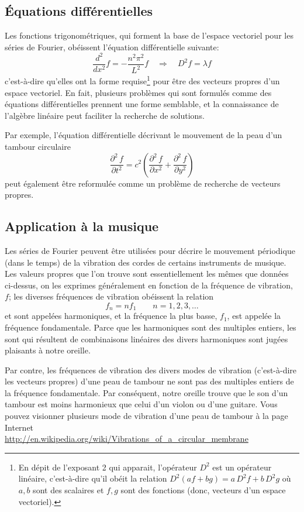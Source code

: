 \subsection{Équations différentielles}

Les fonctions trigonométriques, qui forment la base de l'espace vectoriel pour les séries de Fourier,
obéissent l'équation différentielle suivante:
\[
\frac{d^2}{dx^2} f = -\frac{n^2\pi^2}{L^2} f \quad \Rightarrow \quad D^2 f = \lambda f
\]
c'est-à-dire qu'elles ont la forme requise\footnote{En dépit de l'exposant 2 qui apparait,
l'opérateur $D^2$ est un opérateur linéaire, c'est-à-dire qu'il obéit la relation
$D^2(af+bg) = a\,D^2f + b\,D^2g$ où $a,b$ sont des scalaires et $f,g$ sont des fonctions (donc, vecteurs
d'un espace vectoriel).} pour être des vecteurs propres d'un espace vectoriel.
En fait, plusieurs problèmes qui sont formulés comme des équations différentielles prennent une forme
semblable, et la connaissance de l'algèbre linéaire peut faciliter la recherche de solutions.

Par exemple, l'équation différentielle décrivant le mouvement de la peau d'un tambour circulaire
\[
\frac{\partial^2 \, f}{\partial t^2} = c^2 \left(\frac{\partial^2 \, f}{\partial x^2} + \frac{\partial^2 \, f}{\partial y^2}\right)
\]
peut également être reformulée comme un problème de recherche de vecteurs propres.

\subsection{Application à la musique}

Les séries de Fourier peuvent être utilisées pour décrire le mouvement périodique (dans le temps) de
la vibration des cordes de certains instruments de musique.  Les valeurs propres que l'on trouve sont
essentiellement les mêmes que données ci-dessus, on les exprimes généralement en fonction de la fréquence
de vibration, $f$; les diverses fréquences de  vibration obéissent la relation
\[
f_n = n f_1 \qquad n = 1, 2, 3, \ldots
\]
et sont appelées harmoniques, et la fréquence la plus basse, $f_1$, est appelée la fréquence fondamentale.
Parce que les harmoniques sont des multiples entiers, les sont qui résultent de combinaisons linéaires
des divers harmoniques sont jugées plaisants à notre oreille.

Par contre, les fréquences de vibration des divers modes de vibration (c'est-à-dire les vecteurs propres) d'une
peau de tambour ne sont pas des multiples entiers de la fréquence fondamentale.  Par conséquent,
notre oreille trouve que le son d'un tambour est moins harmonieux que celui d'un violon ou d'une guitare.
Vous pouvez visionner plusieurs mode de vibration d'une peau de tambour à la page Internet\\
\url{http://en.wikipedia.org/wiki/Vibrations_of_a_circular_membrane}

